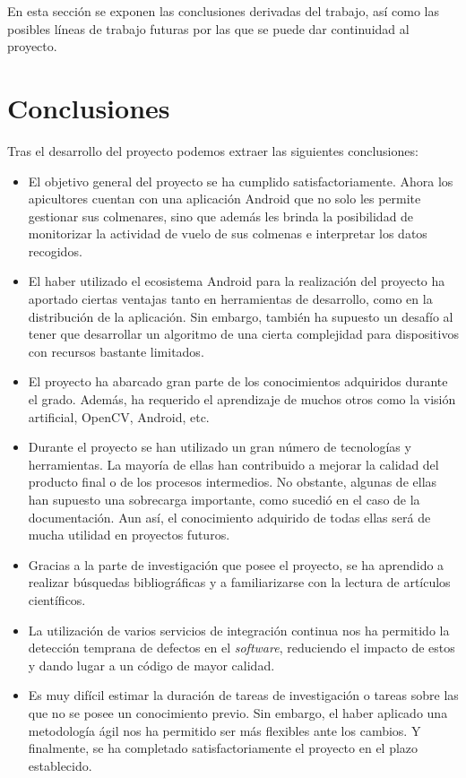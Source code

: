
En esta sección se exponen las conclusiones derivadas del trabajo, así
como las posibles líneas de trabajo futuras por las que se puede dar
continuidad al proyecto.

\section{Conclusiones}\label{conclusiones}

Tras el desarrollo del proyecto podemos extraer las siguientes
conclusiones:

\begin{itemize}
\tightlist
\item
  El objetivo general del proyecto se ha cumplido satisfactoriamente.
  Ahora los apicultores cuentan con una aplicación Android que no solo
  les permite gestionar sus colmenares, sino que además les brinda la
  posibilidad de monitorizar la actividad de vuelo de sus colmenas e
  interpretar los datos recogidos.
\item
  El haber utilizado el ecosistema Android para la realización del
  proyecto ha aportado ciertas ventajas tanto en herramientas de
  desarrollo, como en la distribución de la aplicación. Sin embargo,
  también ha supuesto un desafío al tener que desarrollar un algoritmo
  de una cierta complejidad para dispositivos con recursos bastante
  limitados.
\item
  El proyecto ha abarcado gran parte de los conocimientos adquiridos
  durante el grado. Además, ha requerido el aprendizaje de muchos otros
  como la visión artificial, OpenCV, Android, etc.
\item
  Durante el proyecto se han utilizado un gran número de tecnologías y
  herramientas. La mayoría de ellas han contribuido a mejorar la calidad
  del producto final o de los procesos intermedios. No obstante, algunas
  de ellas han supuesto una sobrecarga importante, como sucedió en el
  caso de la documentación. Aun así, el conocimiento adquirido de todas
  ellas será de mucha utilidad en proyectos futuros.
\item
  Gracias a la parte de investigación que posee el proyecto, se ha
  aprendido a realizar búsquedas bibliográficas y a familiarizarse con
  la lectura de artículos científicos.
\item
  La utilización de varios servicios de integración continua nos ha
  permitido la detección temprana de defectos en el \emph{software},
  reduciendo el impacto de estos y dando lugar a un código de mayor
  calidad.
\item
  Es muy difícil estimar la duración de tareas de investigación o tareas
  sobre las que no se posee un conocimiento previo. Sin embargo, el
  haber aplicado una metodología ágil nos ha permitido ser más flexibles
  ante los cambios. Y finalmente, se ha completado satisfactoriamente el
  proyecto en el plazo establecido.
\end{itemize}

